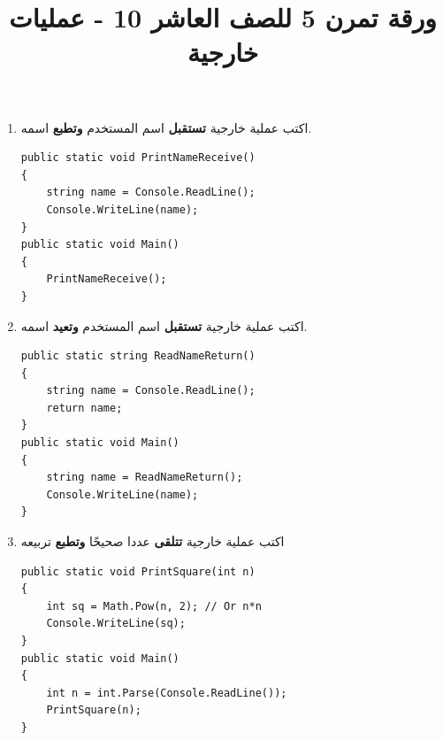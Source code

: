 ﻿\documentclass[12pt]{article}
\title{ورقة تمرن 5 للصف العاشر 10 - عمليات خارجية}
\begin{document}
\maketitle
\thispagestyle{fancy}

\ifwithsols
\begin{enumerate}[itemsep=3em]
\else
\begin{enumerate}
\fi



\begin{boxAttention}
عندما يٌطلب "عملية خارجية \textbf{تستقبل}" يجب ان يكون المستخدم يدخل قيمة للمتغير. أي عليك استعمال \texttt{Console.ReadLine()}. \\


أما عندما يُطلب منك "عملية خارجية \textbf{تتلقى}" فهذا يعني أنّها تتلقى المطلوب كبارمترات.
\end{boxAttention}

\item اكتب عملية خارجية \textbf{تستقبل} اسم المستخدم \textbf{وتطبع} اسمه.
\ifwithsols
\begin{boxSolution}
\begin{english}
\begin{verbatim}
public static void PrintNameReceive()
{
    string name = Console.ReadLine();
    Console.WriteLine(name);
}
public static void Main()
{
    PrintNameReceive();
}
\end{verbatim}
\end{english}
\end{boxSolution}
\clearpage
\fi


\item اكتب عملية خارجية \textbf{تستقبل} اسم المستخدم \textbf{وتعيد} اسمه.
\ifwithsols
\begin{boxSolution}
\begin{english}
\begin{verbatim}
public static string ReadNameReturn()
{
    string name = Console.ReadLine();
    return name;
}
public static void Main()
{
    string name = ReadNameReturn();
    Console.WriteLine(name);
}
\end{verbatim}
\end{english}
\end{boxSolution}
\fi


\item اكتب عملية خارجية \textbf{تتلقى} عددا صحيحًا \textbf{وتطبع} تربيعه
\ifwithsols
\begin{boxSolution}
\begin{english}
\begin{verbatim}
public static void PrintSquare(int n)
{
    int sq = Math.Pow(n, 2); // Or n*n
    Console.WriteLine(sq);
}
public static void Main()
{
    int n = int.Parse(Console.ReadLine());
    PrintSquare(n);
}
\end{verbatim}
\end{english}
\end{boxSolution}
\clearpage
\fi



\end{enumerate}
\end{enumerate}
\end{document}
